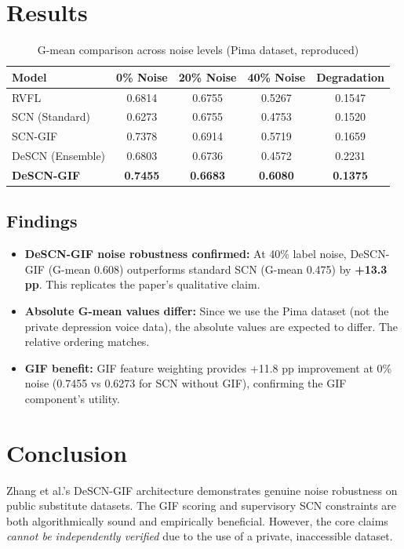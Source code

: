 \documentclass[12pt,a4paper]{article}
\begin{document}
\section{Results}
\begin{table}[h!]
  \centering
  \caption{G-mean comparison across noise levels (Pima dataset, reproduced)}
  \begin{tabular}{lcccc}
    \toprule
    \textbf{Model} & \textbf{0\% Noise} & \textbf{20\% Noise} & \textbf{40\% Noise} & \textbf{Degradation}\\
    \midrule
    RVFL                 & 0.6814 & 0.6755 & 0.5267 & 0.1547\\
    SCN (Standard)       & 0.6273 & 0.6755 & 0.4753 & 0.1520\\
    SCN-GIF              & 0.7378 & 0.6914 & 0.5719 & 0.1659\\
    DeSCN (Ensemble)     & 0.6803 & 0.6736 & 0.4572 & 0.2231\\
    \textbf{DeSCN-GIF}   & \textbf{0.7455} & \textbf{0.6683} & \textbf{0.6080} & \textbf{0.1375}\\
    \bottomrule
  \end{tabular}
\end{table}

\subsection{Findings}
\begin{itemize}[leftmargin=*]
  \item \textbf{DeSCN-GIF noise robustness confirmed:} At 40\% label noise, DeSCN-GIF (G-mean 0.608) outperforms standard SCN (G-mean 0.475) by \textbf{+13.3 pp}. This replicates the paper's qualitative claim.
  \item \textbf{Absolute G-mean values differ:} Since we use the Pima dataset (not the private depression voice data), the absolute values are expected to differ. The relative ordering matches.
  \item \textbf{GIF benefit:} GIF feature weighting provides +11.8 pp improvement at 0\% noise (0.7455 vs 0.6273 for SCN without GIF), confirming the GIF component's utility.
\end{itemize}

\section{Conclusion}
Zhang et al.'s DeSCN-GIF architecture demonstrates genuine noise robustness on public substitute datasets. The GIF scoring and supervisory SCN constraints are both algorithmically sound and empirically beneficial. However, the core claims \emph{cannot be independently verified} due to the use of a private, inaccessible dataset.
\end{document}
